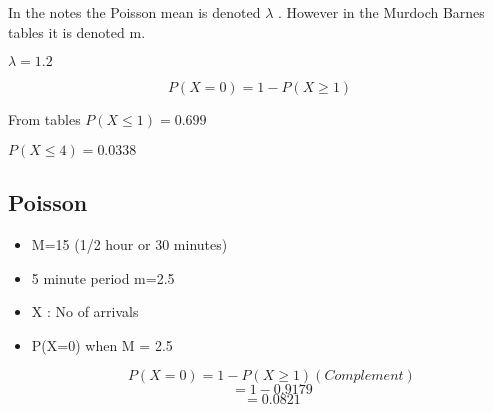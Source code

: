 \documentclass[a4paper,12pt]{article}
\begin{document}
In the notes the Poisson mean is denoted $\lambda$ . However in the Murdoch Barnes tables it is denoted m.

$\lambda = 1.2$




\[P(X=0) = 1 - P(X\geq 1)\]

From tables $P(X \leq 1) = 0.699$


$P(X \leq 4) = 0.0338 $

\subsection{Poisson }
\begin{itemize}
\item M=15
(1/2 hour or 30 minutes)

\item 5 minute period 
m=2.5 

\item X : No of arrivals

\item P(X=0) when M = 2.5

\[P(X=0) = 1 - P(X \geq 1) (Complement)\]
\[= 1 - 0.9179\]
\[= 0.0821\]


\end{itemize}
\end{document}
